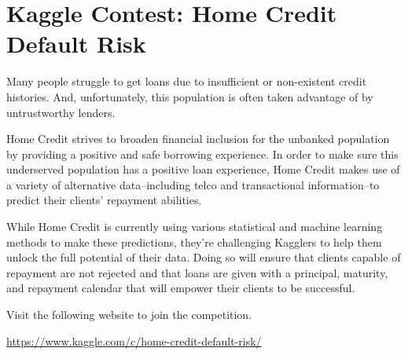 \documentclass[11pt]{article}
\begin{document}
%
%

\section{Kaggle Contest: Home Credit Default Risk}

Many people struggle to get loans due to insufficient or non-existent credit histories. And, unfortunately, this population is often taken advantage of by untrustworthy lenders.

Home Credit strives to broaden financial inclusion for the unbanked population by providing a positive and safe borrowing experience. In order to make sure this underserved population has a positive loan experience, Home Credit makes use of a variety of alternative data--including telco and transactional information--to predict their clients' repayment abilities.

While Home Credit is currently using various statistical and machine learning methods to make these predictions, they're challenging Kagglers to help them unlock the full potential of their data. Doing so will ensure that clients capable of repayment are not rejected and that loans are given with a principal, maturity, and repayment calendar that will empower their clients to be successful.

Visit the following website to join the competition. 

\url{https://www.kaggle.com/c/home-credit-default-risk/}
\end{document}
